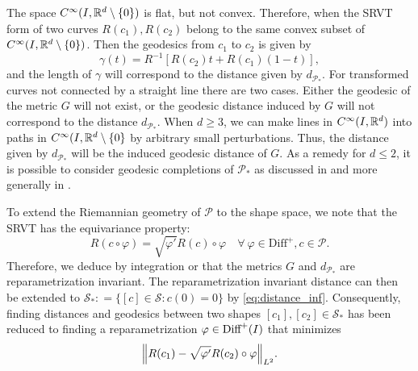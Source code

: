 The space \(C^{\infty}(I, \mathbb{R}^d \setminus \{0\}) \) is flat, but not convex. Therefore, when the SRVT form of two curves \(R(c_1), R(c_2)\) belong to the same convex subset of \(C^{\infty}(I, \mathbb{R}^d \setminus \{0\})\). Then the  geodesics from \(c_1\) to \(c_2\) is given by
\begin{equation*}
  \gamma(t) = R^{-1}[R(c_2)t +  R(c_1)(1-t)],
\end{equation*}
and the length of \(\gamma\) will correspond to the distance given by \(d_{\mathcal{P}_*}\). For transformed curves not connected by a straight line there are two cases. Either the geodesic of the metric \(G\) will not exist, or the geodesic distance induced by \(G\) will not correspond to the  distance \(d_{\mathcal{P}_*}\). When \(d \geq 3\),  we can make lines in \(C^{\infty}(I, \mathbb{R}^d )\) into paths in \(C^{\infty}(I, \mathbb{R}^d \setminus \{0\}\) by arbitrary small perturbations. Thus, the distance given by \(d_{\mathcal{P}_*}\) will be the induced geodesic distance of \(G\). As a remedy for \(d \leq 2 \), it is possible to consider geodesic completions of \(\mathcal{P}_* \) as discussed in \cite{bruveris1016_srvtexample} and more generally in \cite{bruveris2014_geocomp}.


To extend the Riemannian geometry of \(\mathcal{P}\) to the shape space, we note that the SRVT has the equivariance property:
\begin{equation*}
  R(c \circ \varphi) = \sqrt{\varphi'}R(c) \circ \varphi \quad \forall \ \varphi \in \text{Diff}^+, c \in \mathcal{P}.
\end{equation*}
Therefore, we deduce by integration or \cite[Theomrem 3.1]{bauer2014_rprop} that the metrics \(G\) and \(d_{\mathcal{P}_*}\) are reparametrization invariant. The reparametrization invariant distance can then be extended to \(\mathcal{S}_* : = \{[c] \in \mathcal{S}: c(0)=0\}\) by \eqref{eq:distance_inf}. Consequently, finding distances and geodesics between two shapes \([c_1], [c_2]\in \mathcal{S}_*\) has been reduced to finding a reparametrization \(\varphi \in \text{Diff}^+(I)\) that minimizes
\begin{equation} \label{eq:srvt_reparam}
  \norm{R(c_1) - \sqrt{\varphi'} R(c_2)\circ \varphi}_{L^2}.
\end{equation}

